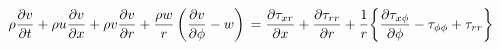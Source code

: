 \begin{equation}
\rho\pdv{v}{t} 
  + \rho u\pdv{v}{x} 
  + \rho v\pdv{v}{r} 
  + \frac{\rho w}{r}\left(\pdv{v}{\phi} - w \right)  \\
= \pdv{\tau_{xr}}{x} 
  + \pdv{\tau_{rr}}{r} 
  + \frac{1}{r}\bigg\{\pdv{\tau_{x\phi}}{\phi} - \tau_{\phi\phi} + \tau_{rr} \bigg\}
\end{equation}

